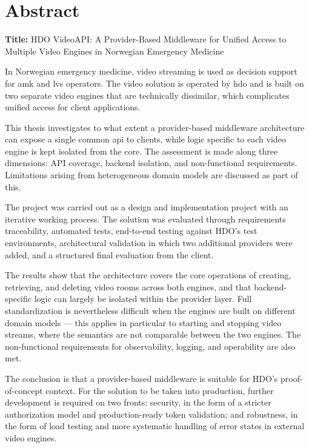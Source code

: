 \chapter*{Abstract}
{\LARGE
\noindent\textbf{Title:} HDO VideoAPI: A Provider-Based Middleware for
Unified Access to Multiple Video Engines in Norwegian Emergency Medicine
}

\bigskip

In Norwegian emergency medicine, video streaming is used as decision support
for \gls{amk} and \gls{lvs} operators. The video solution is operated by \gls{hdo}
and is built on two separate video engines that are technically dissimilar, which
complicates unified access for client applications.

This thesis investigates to what extent a \gls{provider}-based middleware
architecture can expose a single common \gls{api} to clients, while logic specific
to each video engine is kept isolated from the core. The assessment is made along
three dimensions: API coverage, backend isolation, and non-functional requirements.
Limitations arising from heterogeneous domain models are discussed as part of this.

The project was carried out as a design and implementation project with an
iterative working process. The solution was evaluated through requirements
traceability, automated tests, end-to-end testing against HDO's test
environments, architectural validation in which two additional providers were
added, and a structured final evaluation from the client.

The results show that the architecture covers the core operations of creating,
retrieving, and deleting video rooms across both engines, and that backend-specific
logic can largely be isolated within the provider layer. Full standardization is
nevertheless difficult when the engines are built on different domain models ---
this applies in particular to starting and stopping video streams, where the
semantics are not comparable between the two engines. The non-functional
requirements for observability, logging, and operability are also met.

The conclusion is that a provider-based middleware is suitable for HDO's
proof-of-concept context. For the solution to be taken into production, further
development is required on two fronts: security, in the form of a stricter
authorization model and production-ready \gls{token} validation; and robustness,
in the form of load testing and more systematic handling of error states in
external video engines.